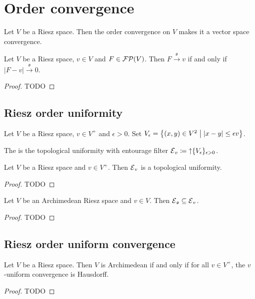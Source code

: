 \section{Order convergence}

\begin{proposition}
Let $V$ be a Riesz space. Then the order convergence on $V$ makes it a vector space convergence.
\end{proposition}

\begin{lemma}
Let $V$ be a Riesz space, $v\in V$ and $F\in\operatorname{\mathcal{FP}}(V)$. Then $F\overset{\mathfrak{o}}{\longrightarrow} v$ \textup{if and only if} $|F - v| \overset{\mathfrak{o}}{\longrightarrow} 0$.
\end{lemma}
\begin{proof}
TODO
\end{proof}


\subsection{Riesz order uniformity}
\begin{definition}
Let $V$ be a Riesz space, $v\in V^+$ and $\epsilon > 0$. Set $V_\epsilon = \setbuilder{(x,y)\in V^2}{|x-y| \leq \epsilon v}$.

The  is the topological uniformity with entourage filter $\operatorname{\mathcal{E}}_v \coloneqq \operatorname{\uparrow} \{V_\epsilon\}_{\epsilon > 0}$.
\end{definition}

\begin{lemma}
Let $V$ be a Riesz space and $v\in V^+$. Then $\operatorname{\mathcal{E}}_v$ is a topological uniformity.
\end{lemma}
\begin{proof}
TODO
\end{proof}

\begin{proposition}
Let $V$ be an Archimedean Riesz space and $v\in V$. Then $\operatorname{\mathcal{E}}_\mathfrak{o} \subseteq \operatorname{\mathcal{E}}_v$.
\end{proposition}
\begin{proof}
TODO
\end{proof}

\subsection{Riesz order uniform convergence}

\begin{proposition}
Let $V$ be a Riesz space. Then $V$ is Archimedean \textup{if and only if} for all $v\in V^+$, the $v$-uniform convergence is Hausdorff.
\end{proposition}
\begin{proof}
TODO
\end{proof}

